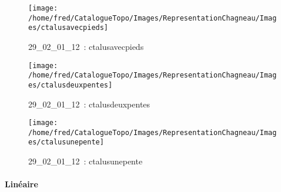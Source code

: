 \documentclass[12pt,titlepage]{book}
\begin{document}
\begin{figure}[h!]
\begin{minipage}[t]{3cm}
  \end{minipage}
  \begin{minipage}[t]{3cm}
    \begin{center}
      \texttt{[image: /home/fred/CatalogueTopo/Images/RepresentationChagneau/Images/ctalusavecpieds]}
      \caption[~29\_02\_01\_12]{\small{29\_02\_01\_12~:} \tiny{ctalusavecpieds}}\label{ctalusavecpieds}
    \end{center}
  \end{minipage}
  \begin{minipage}[t]{3cm}
    \begin{center}
      \texttt{[image: /home/fred/CatalogueTopo/Images/RepresentationChagneau/Images/ctalusdeuxpentes]}
      \caption[~29\_02\_01\_12]{\small{29\_02\_01\_12~:} \tiny{ctalusdeuxpentes}}\label{ctalusdeuxpentes}
    \end{center}
  \end{minipage}
  \begin{minipage}[t]{3cm}
    \begin{center}
      \texttt{[image: /home/fred/CatalogueTopo/Images/RepresentationChagneau/Images/ctalusunepente]}
      \caption[~29\_02\_01\_12]{\small{29\_02\_01\_12~:} \tiny{ctalusunepente}}\label{ctalusunepente}
    \end{center}
  \end{minipage}
\end{figure}


\paragraph{Linéaire}
\noindent
\vspace{\baselineskip}
\end{document}
